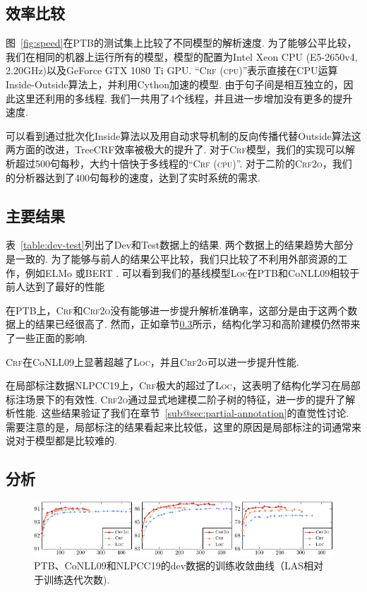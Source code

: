 \subsection{效率比较}

图~\ref{fig:speed}在PTB的测试集上比较了不同模型的解析速度.
为了能够公平比较，我们在相同的机器上运行所有的模型，模型的配置为Intel Xeon CPU (E5-2650v4, 2.20GHz)以及GeForce GTX 1080 Ti GPU.
``\textsc{Crf (cpu)}''表示直接在CPU运算Inside-Outside算法上，并利用Cython加速的模型.
由于句子间是相互独立的，因此这里还利用的多线程.
我们一共用了4个线程，并且进一步增加没有更多的提升速度.

可以看到通过批次化Inside算法以及用自动求导机制的反向传播代替Outside算法这两方面的改进，TreeCRF效率被极大的提升了.
对于\textsc{Crf}模型，我们的实现可以解析超过500句每秒，大约十倍快于多线程的``\textsc{Crf (cpu)}''.
对于二阶的\textsc{Crf2o}，我们的分析器达到了400句每秒的速度，达到了实时系统的需求.

\subsection{主要结果}

表~\ref{table:dev-test}列出了Dev和Test数据上的结果.
两个数据上的结果趋势大部分是一致的.
为了能够与前人的结果公平比较，我们只比较了不利用外部资源的工作，例如ELMo \citep{peters-etal-2018-deep}或BERT \citep{devlin-etal-2019-bert}.
可以看到我们的基线模型\textsc{Loc}在PTB和CoNLL09相较于前人达到了最好的性能

在PTB上，\textsc{Crf}和\textsc{Crf2o}没有能够进一步提升解析准确率，这部分是由于这两个数据上的结果已经很高了.
然而，正如章节\ref{sub@sec:dep-analysis}所示，结构化学习和高阶建模仍然带来了一些正面的影响.

\textsc{Crf}在CoNLL09上显著超越了\textsc{Loc}，并且\textsc{Crf2o}可以进一步提升性能.

在局部标注数据NLPCC19上，\textsc{Crf}极大的超过了\textsc{Loc}，这表明了结构化学习在局部标注场景下的有效性.
\textsc{Crf2o}通过显式地建模二阶子树的特征，进一步的提升了解析性能.
这些结果验证了我们在章节~\ref{sub@sec:partial-annotation}的直觉性讨论.
需要注意的是，局部标注的结果看起来比较低，这里的原因是局部标注的词通常来说对于模型都是比较难的.

\subsection{分析}
\label{sub@sec:dep-analysis}

\begin{figure}[tb!]
  \centering
  \includegraphics[width=\textwidth]{figures/convergency.pdf}
  \caption{
    PTB、CoNLL09和NLPCC19的dev数据的训练收敛曲线（LAS相对于训练迭代次数).}
  \label{fig:convergency}
\end{figure}

